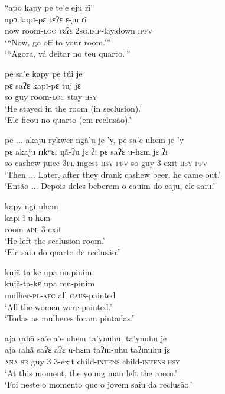 \documentclass[output=paper,
modfonts,nonflat
]{langsci/langscibook}
\begin{document}
\ea “apo kapy pe te'e eju rĩ” \\[.3em]
\gll apɔ kapɪ-pɛ tɛʔɛ ɛ-ju ɾĩ \\
now room-\textsc{loc} \textsc{tɛʔɛ} \textsc{2sg.imp-}lay.down \textsc{ipfv} \\
\glt ‘“Now, go off to your room.’” \\
‘“Agora, vá deitar no teu quarto.’” \\
\z

\newpage 
\ea pe sa'e kapy pe túi je \\[.3em]
\gll pɛ saʔɛ kapɪ-pɛ tuj jɛ \\
so guy room-\textsc{loc} stay \textsc{hsy} \\
\glt ‘He stayed in the room (in seclusion).’ \\
‘Ele ficou no quarto (em reclusão).’ \\
\z

\ea pe ... akaju rykwer ngã'u je 'y, pe sa'e uhem je 'y \\[.3em]
\gll pɛ akaju ɾɪkʷɛɾ ŋã\footnotemark{}-ʔu jɛ ʔɪ pɛ saʔɛ u-hɛm jɛ ʔɪ \\
so cashew juice  \textsc{3pl}-ingest \textsc{hsy} \textsc{pfv} so guy 3-exit  \textsc{hsy} \textsc{pfv} \\
\glt ‘Then ... Later, after they	drank cashew beer, he came out.’ \\
‘Então ... Depois deles beberem o cauim do caju, ele saiu.’ \\
\z

\ea kapy ngi uhem \\[.3em]
\gll kapɪ ĩ u-hɛm \\
room \textsc{abl} 3-exit \\
\glt ‘He left the seclusion room.’ \\
‘Ele saiu do quarto de reclusão.’ \\
\z

\ea kujã ta ke upa mupinim \\[.3em]
\gll kujã-ta-kɛ upa mu-pinim \\
mulher-\textsc{pl}-\textsc{afc} all \textsc{caus}-painted \\
\glt ‘All the women were painted.’ \\
‘Todas as mulheres foram pintadas.’ \\
\z

\ea aja rahã sa'e a'e uhem ta'ynuhu, ta'ynuhu je \\[.3em]
\gll aja ɾahã saʔɛ aʔɛ u-hɛm taʔɪn-uhu taʔɪnuhu jɛ \\
\textsc{ana} \textsc{sr} guy 3 3-exit child-\textsc{intens} child-\textsc{intens} \textsc{hsy} \\
\glt ‘At this moment, the young man left the room.’ \\
‘Foi neste o momento que o jovem saiu da reclusão.’ \\
\z
\end{document}
